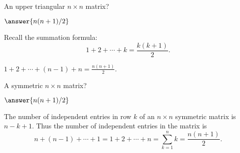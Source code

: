 \documentclass{ximera}
\begin{document}
\begin{exercise}  \label{c1.3.3b}
  An upper triangular $n\times n$ matrix? \begin{prompt}$\answer{n(n+1)/2}$\end{prompt}
  \begin{hint}Recall the
    summation formula:
    \[
      1 + 2 + \cdots + k = \frac{k(k+1)}{2}.
    \]
  \end{hint}

\begin{solution}
$1 + 2 + \cdots + (n-1) + n = \frac{n(n + 1)}{2}$.

\end{solution}
\end{exercise}
\begin{exercise}  \label{c1.3.3c}
A symmetric $n\times n$ matrix?   
\begin{prompt}$\answer{n(n+1)/2}$\end{prompt}

\begin{solution}
The number of independent entries in row $k$ of an $n\times n$ symmetric matrix is $n-k+1$.  Thus the number of independent entries in the matrix is 
\[
n + (n-1) + \cdots + 1 = 1 + 2 + \cdots + n = \sum_{k=1}^n k = \frac{n(n + 1)}{2}.
\]
\end{solution}
\end{exercise}
\end{document}
